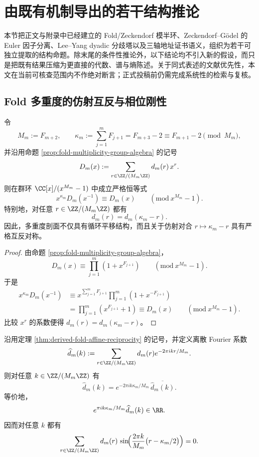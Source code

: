 \documentclass[../../../main.tex]{subfiles}
\begin{document}
\section{由既有机制导出的若干结构推论}\label{app:derived-structure-consequences}

本节把正文与附录中已经建立的 Fold/Zeckendorf 模半环、Zeckendorf--Gödel 的 Euler 因子分离、Lee--Yang dyadic 分歧塔以及三轴地址证书语义，组织为若干可独立提取的结构命题。除末尾的条件性推论外，以下结论均不引入新的假设，而只是把既有结果压缩为更直接的代数、谱与熵陈述。关于同式表述的文献优先性，本文在当前可核查范围内不作绝对断言；正式投稿前仍需完成系统性的检索与复核。

\subsection{Fold 多重度的仿射互反与相位刚性}

\begin{theorem}[折叠多重度的仿射互反对称]\label{thm:derived-fold-affine-reciprocity}
令
\[
M_m:=F_{m+2},
\qquad
\kappa_m:=\sum_{j=1}^{m}F_{j+1}=F_{m+3}-2\equiv F_{m+1}-2 \pmod{M_m},
\]
并沿用命题 \ref{prop:fold-multiplicity-group-algebra} 的记号
\[
D_m(x):=\sum_{r\in \ZZ/(M_m\ZZ)}d_m(r)\,x^r.
\]
则在群环 \(\CC[x]/(x^{M_m}-1)\) 中成立严格恒等式
\[
x^{\kappa_m}D_m(x^{-1})\equiv D_m(x)\qquad (\mathrm{mod}\ x^{M_m}-1).
\]
特别地，对任意 \(r\in \ZZ/(M_m\ZZ)\) 都有
\[
d_m(r)=d_m(\kappa_m-r).
\]
因此，多重度剖面不仅具有循环平移结构，而且关于仿射对合 \(r\mapsto \kappa_m-r\) 具有严格互反对称。
\end{theorem}

\begin{proof}
由命题 \ref{prop:fold-multiplicity-group-algebra}，
\[
D_m(x)\equiv \prod_{j=1}^{m}\left(1+x^{F_{j+1}}\right)\qquad (\mathrm{mod}\ x^{M_m}-1).
\]
于是
\[
\begin{aligned}
x^{\kappa_m}D_m(x^{-1})
&\equiv
x^{\sum_{j=1}^{m}F_{j+1}}
\prod_{j=1}^{m}\left(1+x^{-F_{j+1}}\right) \\
&=
\prod_{j=1}^{m}\left(x^{F_{j+1}}+1\right)
\equiv D_m(x)
\qquad (\mathrm{mod}\ x^{M_m}-1).
\end{aligned}
\]
比较 \(x^r\) 的系数便得
\(
d_m(r)=d_m(\kappa_m-r)
\)。
\end{proof}

\begin{corollary}\label{cor:derived-fold-fourier-phase-rigidity}
沿用定理 \ref{thm:derived-fold-affine-reciprocity} 的记号，并定义离散 Fourier 系数
\[
\widehat d_m(k):=
\sum_{r\in \ZZ/(M_m\ZZ)}d_m(r)e^{-2\pi i kr/M_m}.
\]
则对任意 \(k\in \ZZ/(M_m\ZZ)\) 有
\[
\widehat d_m(k)=e^{-2\pi i k\kappa_m/M_m}\,\overline{\widehat d_m(k)}.
\]
等价地，
\[
e^{\pi i k\kappa_m/M_m}\widehat d_m(k)\in \RR.
\]
因而对任意 \(k\) 都有
\[
\sum_{r\in \ZZ/(M_m\ZZ)}
d_m(r)\,
\sin\!\Bigl(\frac{2\pi k}{M_m}\bigl(r-\kappa_m/2\bigr)\Bigr)=0.
\]
\end{corollary}
\end{document}
